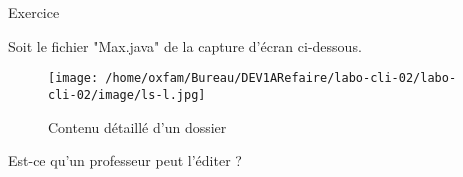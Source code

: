 \documentclass[a4paper,11pt]{article}
\begin{document}
\begin{Exercice}{Exercice}
	
	
	Soit le fichier "Max.java" de la capture d'\'ecran ci-dessous.  
	
	\par
	\begin{figure}[hbt]
		\begin{center}
			\texttt{[image: /home/oxfam/Bureau/DEV1ARefaire/labo-cli-02/labo-cli-02/image/ls-l.jpg]}
			
		\end{center}
		
		\caption[Contenu d\'etaill\'e d'un dossier]{Contenu d\'etaill\'e d'un dossier}
	\end{figure}
	
	Est-ce qu'un professeur peut l'\'editer ? 
	
	\par
	 {\footnotesize\emph{}\par} 
\end{Exercice}	
	
	\clearpage
	
\end{document}
